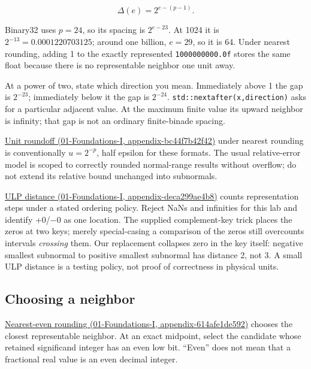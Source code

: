 \[
\Delta(e)=2^{e-(p-1)}.
\]

Binary32 uses \(p=24\), so its spacing is \(2^{e-23}\). At 1024 it is \(2^{-13}=0.0001220703125\); around one billion, \(e=29\), so it is 64. Under nearest rounding, adding 1 to the exactly represented \texttt{1\textquotesingle{}000\textquotesingle{}000\textquotesingle{}000.0f} stores the same float because there is no representable neighbor one unit away.

At a power of two, state which direction you mean. Immediately above 1 the gap is \(2^{-23}\); immediately below it the gap is \(2^{-24}\). \texttt{std::nextafter(x,direction)} asks for a particular adjacent value. At the maximum finite value its upward neighbor is infinity; that gap is not an ordinary finite-binade spacing.

\href{../01-Foundations-I/main.pdf\#nameddest=appendix-bc44f7b42f42}{Unit roundoff (01-Foundations-I, appendix-bc44f7b42f42)} under nearest rounding is conventionally \(u=2^{-p}\), half epsilon for these formats. The usual relative-error model is scoped to correctly rounded normal-range results without overflow; do not extend its relative bound unchanged into subnormals.

\href{../01-Foundations-I/main.pdf\#nameddest=appendix-deca299ae4b8}{ULP distance (01-Foundations-I, appendix-deca299ae4b8)} counts representation steps under a stated ordering policy. Reject NaNs and infinities for this lab and identify +0/−0 as one location. The supplied complement-key trick places the zeros at two keys; merely special-casing a comparison of the zeros still overcounts intervals \emph{crossing} them. Our replacement collapses zero in the key itself: negative smallest subnormal to positive smallest subnormal has distance 2, not 3. A small ULP distance is a testing policy, not proof of correctness in physical units.

\subsection{Choosing a neighbor}\label{05-engine-i-ch001-choosing-a-neighbor}

\href{../01-Foundations-I/main.pdf\#nameddest=appendix-614afe1de592}{Nearest-even rounding (01-Foundations-I, appendix-614afe1de592)} chooses the closest representable neighbor. At an exact midpoint, select the candidate whose retained significand integer has an even low bit. ``Even'' does not mean that a fractional real value is an even decimal integer.

